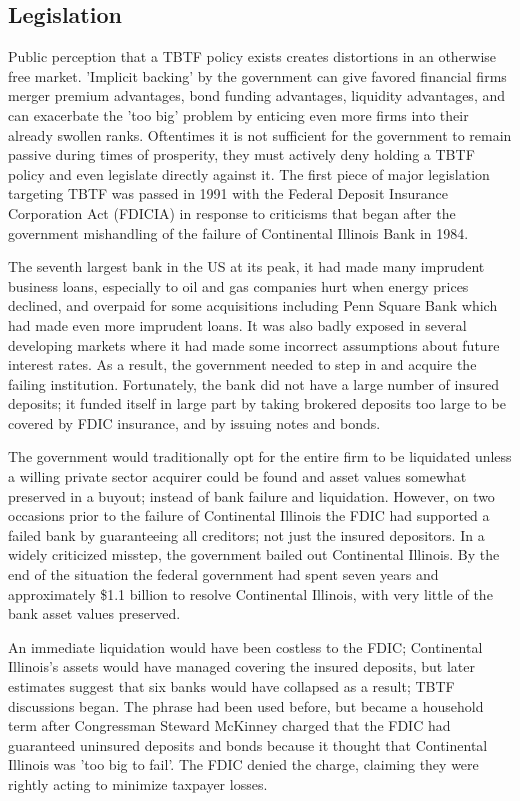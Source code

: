
\subsection{Legislation}
Public perception that a TBTF policy exists creates distortions in an otherwise free market. 'Implicit backing' by the government can give favored financial firms merger premium advantages, bond funding advantages, liquidity advantages, and can exacerbate the 'too big' problem by enticing even more firms into their already swollen ranks.\cite{Baker}\cite{Brewer}\cite{Strongin}\cite{Rime} Oftentimes it is not sufficient for the government to remain passive during times of prosperity, they must actively deny holding a TBTF policy and even legislate directly against it. The first piece of major legislation targeting TBTF was passed in 1991 with the Federal Deposit Insurance Corporation Act (FDICIA) in response to criticisms that began after the government mishandling of the failure of Continental Illinois Bank in 1984.\cite{Wall}

The seventh largest bank in the US at its peak, it had made many imprudent business loans, especially to oil and gas companies hurt when energy prices declined, and overpaid for some acquisitions including Penn Square Bank which had made even more imprudent loans. It was also badly exposed in several developing markets where it had made some incorrect assumptions about future interest rates. As a result, the government needed to step in and acquire the failing institution. Fortunately, the bank did not have a large number of insured deposits; it funded itself in large part by taking brokered deposits too large to be covered by FDIC insurance, and by issuing notes and bonds.\cite{Peterson}

The government would traditionally opt for the entire firm to be liquidated unless a willing private sector acquirer could be found and asset values somewhat preserved in a buyout; instead of bank failure and liquidation.  However, on two occasions prior to the failure of Continental Illinois the FDIC had supported a failed bank by guaranteeing all creditors; not just the insured depositors.  In a widely criticized misstep, the government bailed out Continental Illinois. By the end of the situation the federal government had spent seven years and approximately \$1.1 billion to resolve Continental Illinois, with very little of the bank asset values preserved.\cite{Peterson}

An immediate liquidation would have been costless to the FDIC; Continental Illinois's assets would have managed covering the insured deposits, but later estimates suggest that six banks would have collapsed as a result; TBTF discussions began. The phrase had been used before, but became a household term after Congressman Steward McKinney charged that the FDIC had guaranteed uninsured deposits and bonds because it thought that Continental Illinois was 'too big to fail'. The FDIC denied the charge, claiming they were rightly acting to minimize taxpayer losses.

